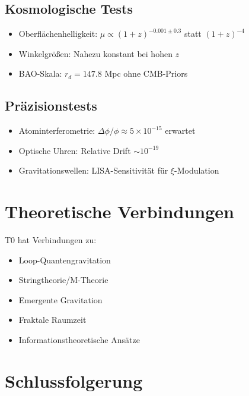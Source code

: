 	\subsection{Kosmologische Tests}
	\begin{itemize}
		\item Oberflächenhelligkeit: $\mu \propto (1+z)^{-0.001\pm0.3}$ statt $(1+z)^{-4}$ \cite{lerner2014}
		\item Winkelgrößen: Nahezu konstant bei hohen $z$ \cite{lopez2010}
		\item BAO-Skala: $r_d = 147.8$ Mpc ohne CMB-Priors \cite{desi2025}
	\end{itemize}
	
	\subsection{Präzisionstests}
	\begin{itemize}
		\item Atominterferometrie: $\Delta\phi/\phi \approx 5 \times 10^{-15}$ erwartet \cite{kasevich2023}
		\item Optische Uhren: Relative Drift $\sim 10^{-19}$ \cite{ludlow2015, brewer2019}
		\item Gravitationswellen: LISA-Sensitivität für $\xi$-Modulation \cite{lisa2017}
	\end{itemize}
	
	\section{Theoretische Verbindungen}
	
	T0 hat Verbindungen zu:
	\begin{itemize}
		\item Loop-Quantengravitation \cite{rovelli2004, ashtekar2004}
		\item Stringtheorie/M-Theorie \cite{polchinski1998, becker2007}
		\item Emergente Gravitation \cite{verlinde2011, jacobson1995}
		\item Fraktale Raumzeit \cite{nottale1993, elnaschie2004}
		\item Informationstheoretische Ansätze \cite{susskind1995, maldacena1998}
	\end{itemize}
	
	\section{Schlussfolgerung}
	
